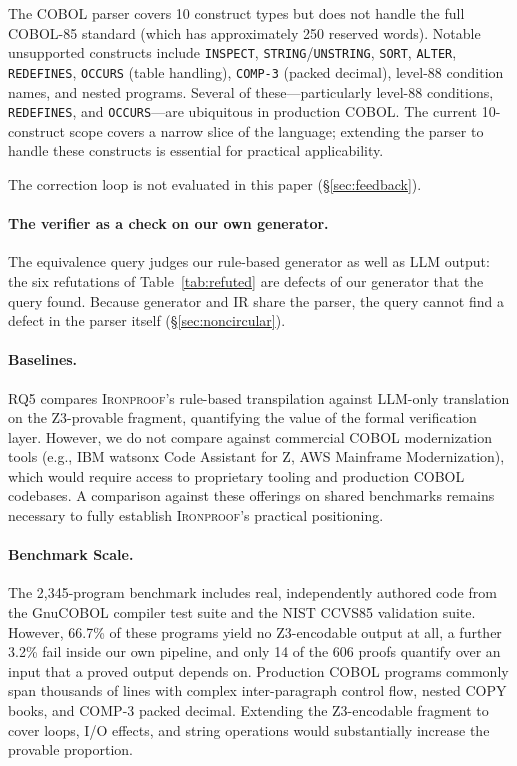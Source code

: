\documentclass[sigconf,nonacm]{acmart}
\begin{document}
The COBOL parser covers 10 construct types but does not handle the full COBOL-85 standard (which has approximately 250 reserved words). Notable unsupported constructs include \texttt{INSPECT}, \texttt{STRING}/\texttt{UNSTRING}, \texttt{SORT}, \texttt{ALTER}, \texttt{REDEFINES}, \texttt{OCCURS} (table handling), \texttt{COMP-3} (packed decimal), level-88 condition names, and nested programs. Several of these---particularly level-88 conditions, \texttt{REDEFINES}, and \texttt{OCCURS}---are ubiquitous in production COBOL. The current 10-construct scope covers a narrow slice of the language; extending the parser to handle these constructs is essential for practical applicability.

The correction loop is not evaluated in this paper (\S\ref{sec:feedback}).

\paragraph{The verifier as a check on our own generator.} The equivalence query judges our rule-based generator as well as LLM output: the six refutations of Table~\ref{tab:refuted} are defects of our generator that the query found. Because generator and IR share the parser, the query cannot find a defect in the parser itself (\S\ref{sec:noncircular}).

\paragraph{Baselines.} RQ5 compares \textsc{Ironproof}'s rule-based transpilation against LLM-only translation on the Z3-provable fragment, quantifying the value of the formal verification layer. However, we do not compare against commercial COBOL modernization tools (e.g., IBM watsonx Code Assistant for Z, AWS Mainframe Modernization), which would require access to proprietary tooling and production COBOL codebases. A comparison against these offerings on shared benchmarks remains necessary to fully establish \textsc{Ironproof}'s practical positioning.

\paragraph{Benchmark Scale.} The 2{,}345-program benchmark includes real, independently authored code from the GnuCOBOL compiler test suite and the NIST CCVS85 validation suite. However, 66.7\% of these programs yield no Z3-encodable output at all, a further 3.2\% fail inside our own pipeline, and only 14 of the 606 proofs quantify over an input that a proved output depends on. Production COBOL programs commonly span thousands of lines with complex inter-paragraph control flow, nested COPY books, and COMP-3 packed decimal. Extending the Z3-encodable fragment to cover loops, I/O effects, and string operations would substantially increase the provable proportion.
\end{document}
